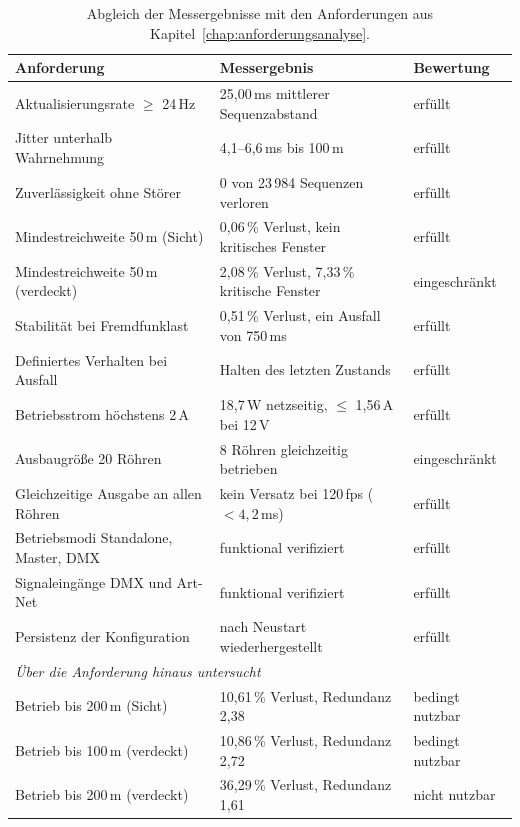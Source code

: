 \begin{table}[htbp]
  \centering
  \small
  \begin{tabular}{lll}
    \toprule
    Anforderung & Messergebnis & Bewertung \\
    \midrule
    Aktualisierungsrate $\geq$ 24\,Hz & 25,00\,ms mittlerer Sequenzabstand & erfüllt \\
    Jitter unterhalb Wahrnehmung & 4,1--6,6\,ms bis 100\,m & erfüllt \\
    Zuverlässigkeit ohne Störer & 0 von 23\,984 Sequenzen verloren & erfüllt \\
    Mindestreichweite 50\,m (Sicht) & 0,06\,\% Verlust, kein kritisches Fenster & erfüllt \\
    Mindestreichweite 50\,m (verdeckt) & 2,08\,\% Verlust, 7,33\,\% kritische Fenster & eingeschränkt \\
    Stabilität bei Fremdfunklast & 0,51\,\% Verlust, ein Ausfall von 750\,ms & erfüllt \\
    Definiertes Verhalten bei Ausfall & Halten des letzten Zustands & erfüllt \\
    Betriebsstrom höchstens 2\,A & 18,7\,W netzseitig, $\leq$ 1,56\,A bei 12\,V & erfüllt \\
    Ausbaugröße 20 Röhren & 8 Röhren gleichzeitig betrieben & eingeschränkt \\
    Gleichzeitige Ausgabe an allen Röhren & kein Versatz bei 120\,fps ($<4{,}2$\,ms) & erfüllt \\
    Betriebsmodi Standalone, Master, DMX & funktional verifiziert & erfüllt \\
    Signaleingänge DMX und Art-Net & funktional verifiziert & erfüllt \\
    Persistenz der Konfiguration & nach Neustart wiederhergestellt & erfüllt \\
    \midrule
    \multicolumn{3}{l}{\emph{Über die Anforderung hinaus untersucht}} \\
    Betrieb bis 200\,m (Sicht) & 10,61\,\% Verlust, Redundanz 2,38 & bedingt nutzbar \\
    Betrieb bis 100\,m (verdeckt) & 10,86\,\% Verlust, Redundanz 2,72 & bedingt nutzbar \\
    Betrieb bis 200\,m (verdeckt) & 36,29\,\% Verlust, Redundanz 1,61 & nicht nutzbar \\
    \bottomrule
  \end{tabular}
  \caption{Abgleich der Messergebnisse mit den Anforderungen aus
    Kapitel~\ref{chap:anforderungsanalyse}.}
  \label{tab:anforderungsabgleich}
\end{table}

